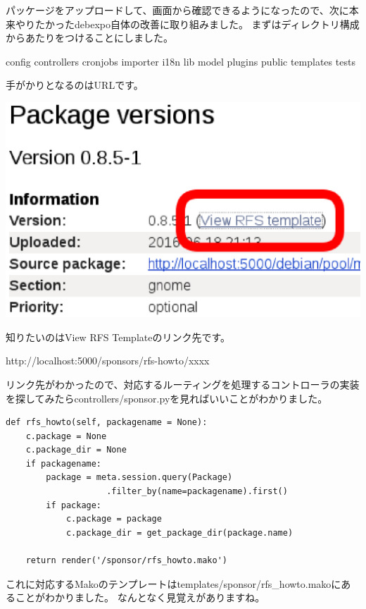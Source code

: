 \documentclass[mingoth,a4paper]{jsarticle}
\begin{document}
パッケージをアップロードして、画面から確認できるようになったので、次に本来やりたかったdebexpo自体の改善に取り組みました。
まずはディレクトリ構成からあたりをつけることにしました。

\begin{commandline}
config
controllers
cronjobs
importer
i18n
lib
model
plugins
public
templates
tests
\end{commandline}

手がかりとなるのはURLです。

\begin{screen}
\includegraphics[width=0.7\hsize]{image201606/debexpo-investigate-rfs-template-link.eps}
\end{screen}

知りたいのはView RFS Templateのリンク先です。

\begin{screen}
http://localhost:5000/sponsors/rfs-howto/xxxx
\end{screen}

リンク先がわかったので、対応するルーティングを処理するコントローラの実装を探してみたらcontrollers/sponsor.pyを見ればいいことがわかりました。

\begin{screen}
\begin{verbatim}
def rfs_howto(self, packagename = None):
    c.package = None
    c.package_dir = None
    if packagename:
        package = meta.session.query(Package)
                    .filter_by(name=packagename).first()
        if package:
            c.package = package
            c.package_dir = get_package_dir(package.name)

    return render('/sponsor/rfs_howto.mako')
\end{verbatim}
\end{screen}

これに対応するMakoのテンプレートはtemplates/sponsor/rfs\_howto.makoにあることがわかりました。
なんとなく見覚えがありますね。
\end{document}
